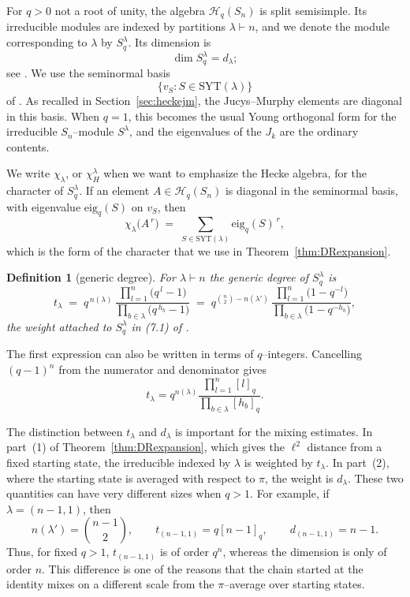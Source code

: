 \documentclass[11pt]{article}
\theoremstyle{plain}  %
\newtheorem{definition}[theorem]{Definition}
\begin{document}
For $q>0$ not a root of unity, the algebra $\mathcal{H}_q(S_n)$ is split
semisimple. Its irreducible modules are indexed by partitions $\lambda\vdash n$,
and we denote the module corresponding to $\lambda$ by $S_q^\lambda$. Its
dimension is
\[
    \dim S_q^\lambda=d_\lambda;
\]
see \cite{DipperJames1986}. We use the seminormal basis
\[
    \{v_S:S\in\mathrm{SYT}(\lambda)\}
\]
of \cite{Murphy1992, Ram1997}. As recalled in Section~\ref{sec:heckejm}, the
Jucys--Murphy elements are diagonal in this basis. When $q=1$, this becomes the
usual Young orthogonal form for the irreducible $S_n$--module $S^\lambda$, and
the eigenvalues of the $J_k$ are the ordinary contents.

We write $\chi_\lambda$, or $\chi_H^\lambda$ when we want to emphasize the
Hecke algebra, for the character of $S_q^\lambda$. If an element
$A\in\mathcal{H}_q(S_n)$ is diagonal in the seminormal basis, with eigenvalue
$\mathrm{eig}_q(S)$ on $v_S$, then
\begin{equation}\label{eq:charsum}
  \chi_\lambda\bigl(A^{\,r}\bigr)
  \;=\; \sum_{S \in \mathrm{SYT}(\lambda)} \mathrm{eig}_q(S)^{\,r} ,
\end{equation}
which is the form of the character that we use in
Theorem~\ref{thm:DRexpansion}.

\begin{definition}[generic degree]\label{def:genericdegree}
For $\lambda \vdash n$ the \emph{generic degree} of $S^{\lambda}_q$ is
\[
  t_\lambda
  \;=\; q^{\,n(\lambda)}\,
        \frac{\prod_{l=1}^{n}\bigl(q^{\,l}-1\bigr)}
             {\prod_{b\in\lambda}\bigl(q^{\,h_b}-1\bigr)}
  \;=\; q^{\binom{n}{2}-n(\lambda')}\,
        \frac{\prod_{l=1}^{n}\bigl(1-q^{-l}\bigr)}
             {\prod_{b\in\lambda}\bigl(1-q^{-h_b}\bigr)} ,
\]
the weight attached to $S^{\lambda}_q$ in \textup{(7.1)} of
\cite{DiaconisRam2000}.
\end{definition}

The first expression can also be written in terms of $q$--integers. Cancelling
$(q-1)^n$ from the numerator and denominator gives
\[
    t_\lambda
    =q^{n(\lambda)}
      \frac{\prod_{l=1}^n[l]_q}
           {\prod_{b\in\lambda}[h_b]_q}.
\]


The distinction between $t_\lambda$ and $d_\lambda$ is important for the
mixing estimates. In part~(1) of Theorem~\ref{thm:DRexpansion}, which gives the
$\ell^2$ distance from a fixed starting state, the irreducible indexed by
$\lambda$ is weighted by $t_\lambda$. In part~(2), where the starting state is
averaged with respect to $\pi$, the weight is $d_\lambda$. These two quantities
can have very different sizes when $q>1$. For example, if
$\lambda=(n-1,1)$, then
\[
    n(\lambda')=\binom{n-1}{2},
    \qquad
    t_{(n-1,1)}=q[n-1]_q,
\qquad
    d_{(n-1,1)}=n-1.
\]
Thus, for fixed $q>1$, $t_{(n-1,1)}$ is of order $q^n$, whereas the dimension
is only of order $n$. This difference is one of the reasons that the chain
started at the identity mixes on a different scale from the $\pi$--average
over starting states.
\end{document}
